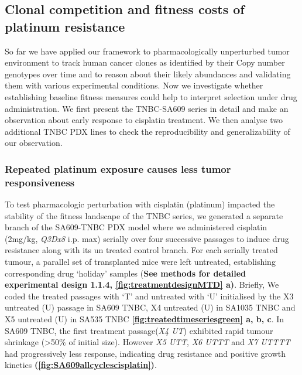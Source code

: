 \subsection{Clonal competition and fitness costs of platinum resistance}
So far we have applied our framework to pharmacologically unperturbed tumor environment to track human cancer clones as identified by their Copy number genotypes over time and to reason about their likely abundances and validating them with various experimental conditions. Now we investigate whether establishing baseline fitness measures could help to interpret selection under drug administration. We first present the TNBC-SA609 series in detail and make an observation about early response to cisplatin treatment. We then analyse two
additional TNBC PDX lines to check the reproducibility  and generalizability of our observation.

\subsubsection{Repeated platinum exposure causes less tumor responsiveness} 
 To test pharmacologic perturbation with cisplatin (platinum) impacted the stability of the fitness landscape of the TNBC series, we generated a separate branch of the SA609-TNBC PDX model where we administered cisplatin (2mg/kg, \textit{Q3Dx8} i.p. max) serially over four successive passages to induce drug resistance along with its un treated control branch. For each serially treated tumour, a parallel set of transplanted mice were left untreated, establishing corresponding drug ‘holiday’ samples (\textbf{See methods for detailed experimental design \textbf{1.1.4}, \textbf{\autoref{fig:treatmentdesignMTD} a)}}. Briefly, We coded the treated passages with `T' and untreated with `U' initialised by the X3 untreated (U) passage in SA609 TNBC, X4 untreated (U) in SA1035 TNBC and X5 untreated (U) in SA535 TNBC \textbf{\autoref{fig:treatedtimeseriesgreen} a, b, c}. In SA609 TNBC, the first treatment passage(\textit{X4 UT}) exhibited rapid tumour shrinkage (>50\% of initial size). However \textit{X5 UTT}, \textit{X6 UTTT} and \textit{X7 UTTTT} had progressively less response, indicating drug resistance and positive growth kinetics \textbf{(\autoref{fig:SA609allcyclescisplatin})}. 


